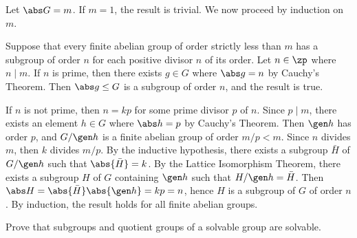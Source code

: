 \begin{sol}
    Let $\abs G = m$. If $m = 1$, the result is trivial. We now proceed by induction on $m$.

    Suppose that every finite abelian group of order strictly less than $m$ has a subgroup of order $n$ for each positive divisor $n$ of its order. Let $n \in \zp$ where $n \mid m$. If $n$ is prime, then there exists $g \in G$ where $\abs g = n$ by Cauchy's Theorem. Then $\abs g \leq G$ is a subgroup of order $n$, and the result is true. 
    
    If $n$ is not prime, then $n = kp$ for some prime divisor $p$ of $n$. Since $p \mid m$, there exists an element $h \in G$ where $\abs h = p$ by Cauchy's Theorem. Then $\gen h$ has order $p$, and $G/\gen h$ is a finite abelian group of order $m/p < m$. Since $n$ divides $m$, then $k$ divides $m/p$. By the inductive hypothesis, there exists a subgroup $\bar H$ of $G/\gen h$ such that $\abs{\bar H} = k$. By the Lattice Isomorphism Theorem, there exists a subgroup $H$ of $G$ containing $\gen h$ such that $H/\gen h = \bar H$. Then $\abs H = \abs{\bar H} \abs{\gen h} = kp = n$, hence $H$ is a subgroup of $G$ of order $n$. By induction, the result holds for all finite abelian groups.
\end{sol}

\begin{specialexercise}\label{ex3.4.5}
    Prove that subgroups and quotient groups of a solvable group are solvable.
\end{specialexercise}


